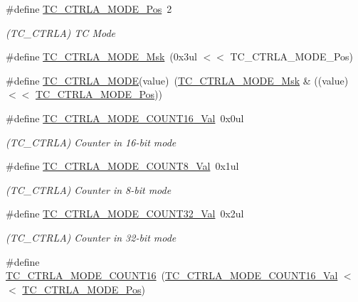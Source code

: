 \begin{DoxyCompactItemize}
\item 
\#define \mbox{\hyperlink{group___s_a_m_d21___t_c_gaae33620c144befdc20a57898c2d5bb96}{T\+C\+\_\+\+C\+T\+R\+L\+A\+\_\+\+M\+O\+D\+E\+\_\+\+Pos}}~2
\begin{DoxyCompactList}\small\item\em (T\+C\+\_\+\+C\+T\+R\+LA) TC Mode \end{DoxyCompactList}\item 
\#define \mbox{\hyperlink{group___s_a_m_d21___t_c_gaf39aa4438c72db51e8c8e34ba956bc33}{T\+C\+\_\+\+C\+T\+R\+L\+A\+\_\+\+M\+O\+D\+E\+\_\+\+Msk}}~(0x3ul $<$$<$ T\+C\+\_\+\+C\+T\+R\+L\+A\+\_\+\+M\+O\+D\+E\+\_\+\+Pos)
\item 
\#define \mbox{\hyperlink{group___s_a_m_d21___t_c_ga9e55767686ff9ec233d03f26643a5fd3}{T\+C\+\_\+\+C\+T\+R\+L\+A\+\_\+\+M\+O\+DE}}(value)~(\mbox{\hyperlink{group___s_a_m_d21___t_c_gaf39aa4438c72db51e8c8e34ba956bc33}{T\+C\+\_\+\+C\+T\+R\+L\+A\+\_\+\+M\+O\+D\+E\+\_\+\+Msk}} \& ((value) $<$$<$ \mbox{\hyperlink{group___s_a_m_d21___t_c_gaae33620c144befdc20a57898c2d5bb96}{T\+C\+\_\+\+C\+T\+R\+L\+A\+\_\+\+M\+O\+D\+E\+\_\+\+Pos}}))
\item 
\#define \mbox{\hyperlink{group___s_a_m_d21___t_c_gacf36c4f8dfa9af8b7d0b8103ded6df59}{T\+C\+\_\+\+C\+T\+R\+L\+A\+\_\+\+M\+O\+D\+E\+\_\+\+C\+O\+U\+N\+T16\+\_\+\+Val}}~0x0ul
\begin{DoxyCompactList}\small\item\em (T\+C\+\_\+\+C\+T\+R\+LA) Counter in 16-\/bit mode \end{DoxyCompactList}\item 
\#define \mbox{\hyperlink{group___s_a_m_d21___t_c_ga5e47a24a6c4391f521cae7e09c51fe85}{T\+C\+\_\+\+C\+T\+R\+L\+A\+\_\+\+M\+O\+D\+E\+\_\+\+C\+O\+U\+N\+T8\+\_\+\+Val}}~0x1ul
\begin{DoxyCompactList}\small\item\em (T\+C\+\_\+\+C\+T\+R\+LA) Counter in 8-\/bit mode \end{DoxyCompactList}\item 
\#define \mbox{\hyperlink{group___s_a_m_d21___t_c_gac7e348d6c5100444a6b538d20b420c8c}{T\+C\+\_\+\+C\+T\+R\+L\+A\+\_\+\+M\+O\+D\+E\+\_\+\+C\+O\+U\+N\+T32\+\_\+\+Val}}~0x2ul
\begin{DoxyCompactList}\small\item\em (T\+C\+\_\+\+C\+T\+R\+LA) Counter in 32-\/bit mode \end{DoxyCompactList}\item 
\#define \mbox{\hyperlink{group___s_a_m_d21___t_c_ga17918a3e4bf9763601e5af52bb16f8e5}{T\+C\+\_\+\+C\+T\+R\+L\+A\+\_\+\+M\+O\+D\+E\+\_\+\+C\+O\+U\+N\+T16}}~(\mbox{\hyperlink{group___s_a_m_d21___t_c_gacf36c4f8dfa9af8b7d0b8103ded6df59}{T\+C\+\_\+\+C\+T\+R\+L\+A\+\_\+\+M\+O\+D\+E\+\_\+\+C\+O\+U\+N\+T16\+\_\+\+Val}}     $<$$<$ \mbox{\hyperlink{group___s_a_m_d21___t_c_gaae33620c144befdc20a57898c2d5bb96}{T\+C\+\_\+\+C\+T\+R\+L\+A\+\_\+\+M\+O\+D\+E\+\_\+\+Pos}})
$$
\end{DoxyCompactItemize}
